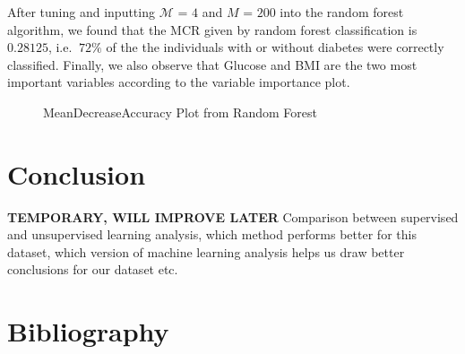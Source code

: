 \documentclass[12pt]{article}
\begin{document}
After tuning and inputting $\mathcal{M}$ = $4$ and $M$ = $200$ into the random forest algorithm, we found that the MCR given by random forest classification is $0.28125$, i.e. $~72\%$ of the the individuals with or without diabetes were correctly classified.
Finally, we also observe that Glucose and BMI are the two most important variables according to the variable importance plot.

\begin{figure}[h!]
	\centering
	\caption{MeanDecreaseAccuracy Plot from Random Forest} 
	\label{fig:RFPlot}
\end{figure}


\section{Conclusion}

\textbf{TEMPORARY, WILL IMPROVE LATER} Comparison between supervised and unsupervised learning analysis, which method performs better for this dataset, which version of machine learning analysis helps us draw better conclusions for our dataset etc. 

 \section{Bibliography}
  
 
\end{document}
